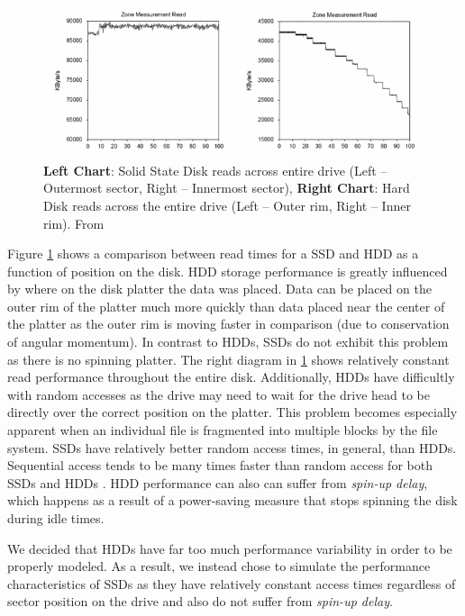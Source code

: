 \documentclass[10pt,letter]{article}
\begin{document}
\begin{figure}
\centering
\includegraphics[width=\textwidth]{disk-perf}
\caption{{\bf Left Chart}: Solid State Disk reads across entire drive (Left -- Outermost sector, Right -- Innermost sector), {\bf Right Chart}: Hard Disk reads across the entire drive (Left -- Outer rim, Right -- Inner rim). From \cite{disk-perf}}
\label{fig:hdd-vs-sdd}
\end{figure}

Figure \ref{fig:hdd-vs-sdd} shows a comparison between read times for a SSD and HDD as a function of position on the disk. HDD storage performance is greatly influenced by where on the disk platter the data was placed. Data can be placed on the outer rim of the platter much more quickly than data placed near the center of the platter as the outer rim is moving faster in comparison (due to conservation of angular momentum). In contrast to HDDs, SSDs do not exhibit this problem as there is no spinning platter. The right diagram in \ref{fig:hdd-vs-sdd} shows relatively constant read performance throughout the entire disk. Additionally, HDDs have difficultly with random accesses as the drive may need to wait for the drive head to be directly over the correct position on the platter. This problem becomes especially apparent when an individual file is fragmented into multiple blocks by the file system. SSDs have relatively better random access times, in general, than HDDs. Sequential access tends to be many times faster than random access for both SSDs and HDDs \cite{disk-perf}. HDD performance can also can suffer from {\em spin-up delay}, which happens as a result of a power-saving measure that stops spinning the disk during idle times.

We decided that HDDs have far too much performance variability in order to be properly modeled. As a result, we instead chose to simulate the performance characteristics of SSDs as they have relatively constant access times regardless of sector position on the drive and also do not suffer from {\em spin-up delay}.
\end{document}
